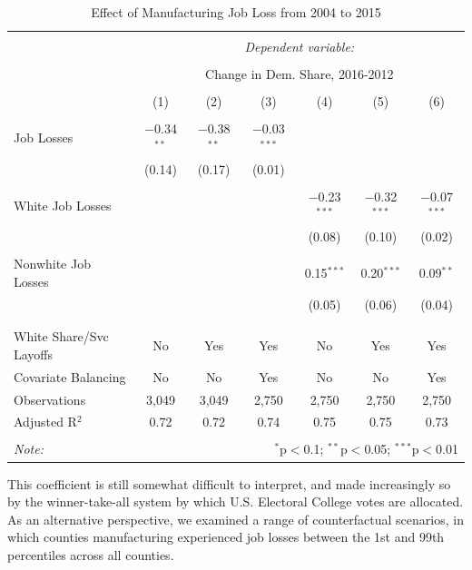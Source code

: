 \documentclass[]{AEA}
\begin{document}
\begin{table}[!htbp] \centering 
  \caption{Effect of Manufacturing Job Loss from 2004 to 2015} 
  \label{regResult04} 
\begin{tabular}{@{\extracolsep{5pt}}lcccccc} 
\\[-1.8ex]\hline 
\hline \\[-1.8ex] 
 & \multicolumn{6}{c}{\textit{Dependent variable:}} \\ 
\cline{2-7} 
\\[-1.8ex] & \multicolumn{6}{c}{Change in Dem. Share, 2016-2012} \\ 
\\[-1.8ex] & (1) & (2) & (3) & (4) & (5) & (6)\\ 
\hline \\[-1.8ex] 
 Job Losses & $-$0.34$^{**}$ & $-$0.38$^{**}$ & $-$0.03$^{***}$ &  &  &  \\ 
  & (0.14) & (0.17) & (0.01) &  &  &  \\ 
  & & & & & & \\ 
 White Job Losses &  &  &  & $-$0.23$^{***}$ & $-$0.32$^{***}$ & $-$0.07$^{***}$ \\ 
  &  &  &  & (0.08) & (0.10) & (0.02) \\ 
  & & & & & & \\ 
 Nonwhite Job Losses &  &  &  & 0.15$^{***}$ & 0.20$^{***}$ & 0.09$^{**}$ \\ 
  &  &  &  & (0.05) & (0.06) & (0.04) \\ 
  & & & & & & \\ 
\hline \\[-1.8ex] 
White Share/Svc Layoffs & No & Yes & Yes & No & Yes & Yes \\ 
Covariate Balancing & No & No & Yes & No & No & Yes \\ 
Observations & 3,049 & 3,049 & 2,750 & 2,750 & 2,750 & 2,750 \\ 
Adjusted R$^{2}$ & 0.72 & 0.72 & 0.74 & 0.75 & 0.75 & 0.73 \\ 
\hline 
\hline \\[-1.8ex] 
\textit{Note:}  & \multicolumn{6}{r}{$^{*}$p$<$0.1; $^{**}$p$<$0.05; $^{***}$p$<$0.01} \\ 
\end{tabular} 
\end{table} 
\FloatBarrier

This coefficient is still somewhat difficult to interpret, and made
increasingly so by the winner-take-all system by which U.S. Electoral
College votes are allocated. As an alternative perspective, we examined
a range of counterfactual scenarios, in which counties manufacturing
experienced job losses between the 1st and 99th percentiles across all
counties.
\end{document}
